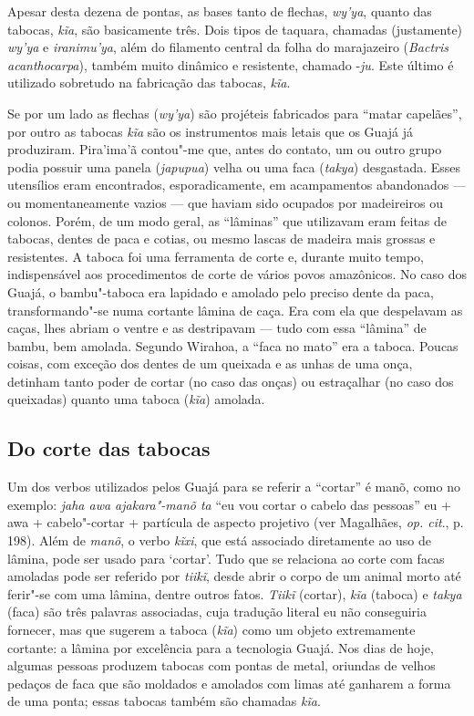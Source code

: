 Apesar desta dezena de pontas, as bases tanto de flechas, \emph{wy'ya},
quanto das tabocas, \emph{kĩa}, são basicamente três. Dois tipos de
taquara, chamadas (justamente) \emph{wy'ya} e \emph{iranimu'ya}, além do
filamento central da folha do marajazeiro (\emph{Bactris acanthocarpa}),
também muito dinâmico e resistente, chamado -\emph{ju}. Este último é
utilizado sobretudo na fabricação das tabocas, \emph{kĩa}.

Se por um lado as flechas (\emph{wy'ya}) são projéteis fabricados para
``matar capelães'', por outro as tabocas \emph{kĩa} são os instrumentos
mais letais que os Guajá já produziram. Pira'ima'ã contou"-me que, antes
do contato, um ou outro grupo podia possuir uma panela (\emph{japupua})
velha ou uma faca (\emph{takya}) desgastada. Esses utensílios eram
encontrados, esporadicamente, em acampamentos abandonados --- ou
momentaneamente vazios --- que haviam sido ocupados por madeireiros ou
colonos. Porém, de um modo geral, as ``lâminas'' que utilizavam eram
feitas de tabocas, dentes de paca e cotias, ou mesmo lascas de madeira
mais grossas e resistentes. A taboca foi uma ferramenta de corte e,
durante muito tempo, indispensável aos procedimentos de corte de vários
povos amazônicos. No caso dos Guajá, o bambu"-taboca era lapidado e
amolado pelo preciso dente da paca, transformando"-se numa cortante
lâmina de caça. Era com ela que despelavam as caças, lhes abriam o
ventre e as destripavam --- tudo com essa ``lâmina'' de bambu, bem amolada.
Segundo Wirahoa, a ``faca no mato'' era a taboca. Poucas coisas, com
exceção dos dentes de um queixada e as unhas de uma onça, detinham tanto
poder de cortar (no caso das onças) ou estraçalhar (no caso dos
queixadas) quanto uma taboca (\emph{kĩa}) amolada.

\subsection{Do corte das tabocas}

\forceindent
Um dos verbos utilizados pelos Guajá para se referir a ``cortar'' é
manõ, como no exemplo: \emph{jaha awa ajakara"-manõ ta} ``eu vou cortar o
cabelo das pessoas'' eu + awa + cabelo"-cortar + partícula de aspecto
projetivo (ver Magalhães, \emph{op. cit}., p. 198). Além de \emph{manõ}, o
verbo \emph{kĩxi}, que está associado diretamente ao uso de lâmina, pode
ser usado para `cortar'. Tudo que se relaciona ao corte com facas
amoladas pode ser referido por \emph{tiikĩ}, desde abrir o corpo de um
animal morto até ferir"-se com uma lâmina, dentre outros fatos.
\emph{Tiikĩ} (cortar), \emph{kĩa} (taboca) e \emph{takya} (faca) são
três palavras associadas, cuja tradução literal eu não conseguiria
fornecer, mas que sugerem a taboca (\emph{kĩa}) como um objeto
extremamente cortante: a lâmina por excelência para a tecnologia Guajá.
Nos dias de hoje, algumas pessoas produzem tabocas com pontas de metal,
oriundas de velhos pedaços de faca que são moldados e amolados com limas
até ganharem a forma de uma ponta; essas tabocas também são chamadas
\emph{kĩa}.


